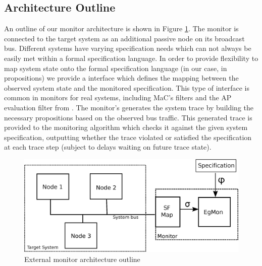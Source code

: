 \subsection{Architecture Outline}
An outline of our monitor architecture is shown in Figure \ref{fig:architecture}. 
The monitor is connected to the target system as an additional passive node on its broadcast bus. 
Different systems have varying specification needs which can not always be easily met within a formal specification language. 
In order to provide flexibility to map system state onto the formal specification language (in our case, in propositions) we provide a \sfmap interface which defines the mapping between the observed system state and the monitored specification. 
This type of interface is common in monitors for real systems, including MaC's filters \cite{Kim2004} and the AP evaluation filter from \cite{Heffernan2014}.
The monitor's \sfmap generates the system trace by building the necessary propositions based on the observed bus traffic. 
This generated trace is provided to the monitoring algorithm which checks it against the given system specification, outputting whether the trace violated or satisfied the specification at each trace step (subject to delays waiting on future trace state).

\begin{figure}
\includegraphics[width=4.5in]{img/newArch}
\caption{External monitor architecture outline \label{fig:architecture}}
\end{figure}


